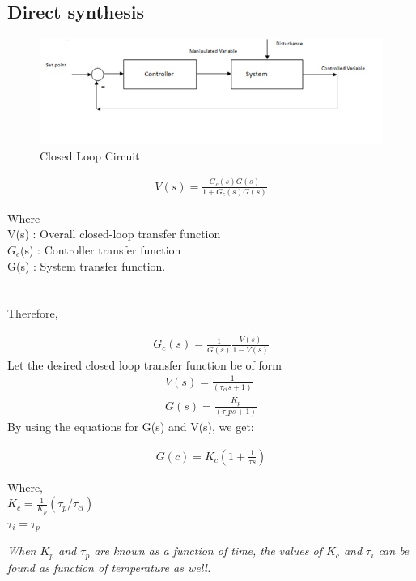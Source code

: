 \subsection{Direct synthesis}

\begin{figure}[h]
	\centering
		\includegraphics[scale = 20,width = 1\linewidth]{Vikas_self/report_tex/Closed Loop Circuit.jpg}
	\caption{Closed Loop Circuit}
\end{figure}

\begin{align}
V(s) = \frac {G_c(s) G(s)}{1+G_c(s) G(s)}
\end{align}

Where\\
V(s) : Overall closed-loop transfer function\\
$G_c$(s) : Controller transfer function\\
G(s) : System transfer function.\\ \\\\
Therefore,

\begin{align*}
G_c(s) = \frac 1{G(s)} \frac {V(s)}{1-V(s)}
\end{align*}
Let the desired closed loop transfer function be of form
\begin{align}
V(s)=\frac 1{(\tau_{cl}s+1)}\\
G(s)=\frac {K_p}{(\tau\_p s+1)}
\end{align}
By using the equations for G(s) and V(s), we get:

\begin{align}
G(c)=K_c(1 + \frac {1}{\tau s})
\end{align}

Where,\\
$K_c = \frac 1{K_p} (\tau_p / \tau_{cl} )$\\
$\tau_i = \tau_p$

\textit{When $K_p$ and $\tau_p$ are known as a function of time, the values of $K_c$ and $\tau_i$ can be found as function of temperature as well.}
\newpage
